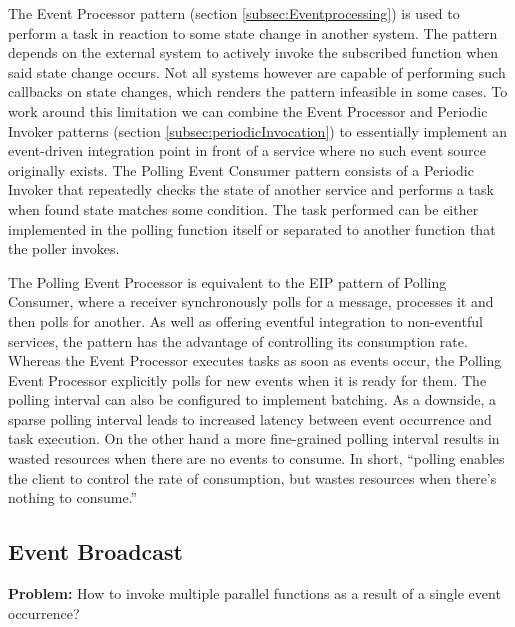 The Event Processor pattern (section \ref{subsec:Eventprocessing}) is used to perform a task in reaction to some state change in another system. The pattern depends on the external system to actively invoke the subscribed function when said state change occurs. Not all systems however are capable of performing such callbacks on state changes, which renders the pattern infeasible in some cases. To work around this limitation we can combine the Event Processor and Periodic Invoker patterns (section \ref{subsec:periodicInvocation}) to essentially implement an event-driven integration point in front of a service where no such event source originally exists. The Polling Event Consumer pattern consists of a Periodic Invoker that repeatedly checks the state of another service and performs a task when found state matches some condition. The task performed can be either implemented in the polling function itself or separated to another function that the poller invokes.

The Polling Event Processor is equivalent to the EIP pattern of Polling Consumer, where a receiver synchronously polls for a message, processes it and then polls for another. As well as offering eventful integration to non-eventful services, the pattern has the advantage of controlling its consumption rate. Whereas the Event Processor executes tasks as soon as events occur, the Polling Event Processor explicitly polls for new events when it is ready for them. The polling interval can also be configured to implement batching. As a downside, a sparse polling interval leads to increased latency between event occurrence and task execution. On the other hand a more fine-grained polling interval results in wasted resources when there are no events to consume. In short, ``polling enables the client to control the rate of consumption, but wastes resources when there’s nothing to consume.'' \parencite{hohpe2004enterprise}

\subsection{Event Broadcast} \label{subsec:EventBroadcast}

\textbf{Problem:} How to invoke multiple parallel functions as a result of a single event occurrence?


